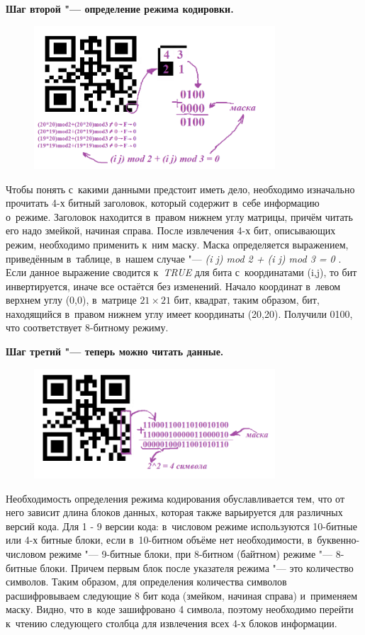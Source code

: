 \documentclass[final,pdftex]{../../template/epsilonj}
\begin{document}
\newpage
\textbf{Шаг второй "--- определение режима кодировки.}
\begin{figure}[htbp]
	\noindent
	\hfil
	\includegraphics[width=90mm]{21.png}
	\hfil
\end{figure}

Чтобы понять с~какими данными предстоит иметь дело, необходимо изначально прочитать 4-х битный заголовок, который содержит в~себе информацию о~режиме. Заголовок находится в~правом нижнем углу матрицы, причём читать его надо змейкой, начиная справа. После извлечения 4-х бит, описывающих режим, необходимо применить к~ним маску. Маска определяется выражением, приведённым в~таблице, в~нашем случае "--- {\it (i j) mod 2 + (i j) mod 3 = 0} . Если данное выражение сводится к~{\it TRUE} для бита с~координатами (i,j), то бит инвертируется, иначе все остаётся без изменений. Начало координат в~левом верхнем углу (0,0), в~матрице $21\times21$ бит, квадрат, таким образом, бит, находящийся в~правом нижнем углу имеет координаты (20,20). Получили 0100, что соответствует 8-битному режиму.

\textbf{Шаг третий "--- теперь можно читать данные.}
\begin{figure}[htb]
	\noindent
	\hfil
	\includegraphics[width=90mm]{31.png}
	\hfil
\end{figure}

Необходимость определения режима кодирования обуславливается тем, что от него зависит длина блоков данных, которая также варьируется для различных версий кода. Для 1 - 9 версии кода: в~числовом режиме используются 10-битные или 4-х битные блоки, если в~10-битном объёме нет необходимости, в~буквенно-числовом режиме "--- 9-битные блоки, при 8-битном (байтном) режиме "--- 8-битные блоки. Причем первым блок после указателя режима "--- это количество символов. Таким образом, для определения количества символов расшифровываем следующие 8 бит кода (змейком, начиная справа) и~применяем маску. Видно, что в~коде зашифровано 4 символа, поэтому необходимо перейти к~чтению следующего столбца для извлечения всех 4-х блоков информации.
\end{document}
